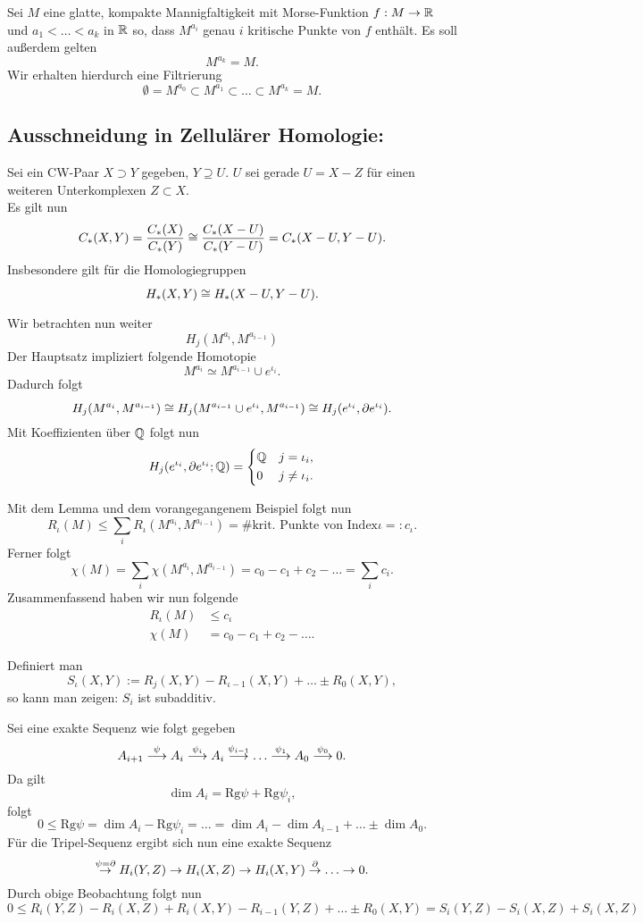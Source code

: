 Sei $M$ eine glatte, kompakte Mannigfaltigkeit mit Morse-Funktion $f : M \overset{}{\rightarrow} \mathbb{R}$ und $a_1 < \ldots < a_k$ in $\mathbb{R}$ so, dass $M^{a_i}$ genau $i$ kritische Punkte von $f$ enthält. Es soll außerdem gelten
\[ M^{a_k} = M. \]
Wir erhalten hierdurch eine Filtrierung
\[ \emptyset = M^{a_0} \subset M^{a_1} \subset \ldots \subset M^{a_k} = M. \]

\subsection{Ausschneidung in Zellulärer Homologie:}
Sei ein CW-Paar $X \supset Y$ gegeben, $Y \supseteq U$. $U$ sei gerade $U = X -Z$ für einen weiteren Unterkomplexen $Z \subset X$.\\
Es gilt nun
\[ C_*(X,Y) = \frac{C_*(X)}{C_*(Y)} 
\overset{}{\cong} \frac{C_*(X-U)}{C_*(Y-U)}
= C_*(X- U, Y - U). \]
Insbesondere gilt für die Homologiegruppen
\[ H_*(X,Y) \overset{}{\cong} H_*(X- U, Y-U). \]



Wir betrachten nun weiter
\[ H_j(M^{a_i}, M^{a_{i-1}})\]
Der Hauptsatz impliziert folgende Homotopie
\[ M^{a_i} \simeq M^{a_{i-1}} \cup e^{\iota_i}. \]
Dadurch folgt
\[  H_j(M^{a_i}, M^{a_{i-1}}) \overset{}{\cong} H_j(M^{a_{i-1}} \cup e^{\iota_i}, M^{a_{i-1}} ) \overset{}{\cong} H_j(e^{\iota_i}, \partial e^{\iota_i}). \]
Mit Koeffizienten über $\mathbb{Q}$ folgt nun
\[ H_j(e^{\iota_i}, \partial e^{\iota_i}; \mathbb{Q}) =
\left\lbrace
\begin{aligned}
&\mathbb{Q} && j = \iota_i,\\
&0 && j \neq \iota_i.
\end{aligned}
\right.
   \]
   
Mit dem Lemma und dem vorangegangenem Beispiel folgt nun
\[ R_\iota(M) \leq \sum_{i} R_\iota(M^{a_i}, M^{a_{i-1}}) = \# \text{krit. Punkte von Index} \iota =: c_\iota. \]
Ferner folgt
\[ \chi(M) = \sum_{i} \chi(M^{a_i}, M^{a_{i-1}}) = c_0 - c_1 + c_2 - \ldots = \sum_{i} c_i. \]
Zusammenfassend haben wir nun folgende 
\begin{align*}
R_\iota (M) &\leq c_\iota\\
\chi(M) &= c_0 - c_1 + c_2 - \ldots.
\end{align*}

Definiert man
\[ S_\iota(X,Y) := R_{j}(X,Y) - R_{\iota-1}(X,Y) + \ldots \pm R_0(X,Y), \]
so kann man zeigen:
\Lem{}
$S_i$ ist subadditiv.
\begin{Beweis}{}
Sei eine exakte Sequenz wie folgt gegeben
\[ A_{i+1} \overset{\psi}{\longrightarrow}A_{i} \overset{\psi_{i}}{\longrightarrow}A_{i} \overset{\psi_{i-1}}{\longrightarrow} \ldots  \overset{\psi_{1}}{\longrightarrow}A_{0} \overset{\psi_{0}}{\longrightarrow} 0.  \]
Da gilt
\[ \dim A_i = \text{Rg} \psi + \text{Rg} \psi_i, \]
folgt
\[ 0 \leq \text{Rg} \psi = \dim A_i - \text{Rg} \psi_i = \ldots = \dim A_i - \dim A_{i-1} + \ldots \pm \dim A_0.  \]
Für die Tripel-Sequenz ergibt sich nun eine exakte Sequenz
\[ \overset{\psi = \partial}{\rightarrow} H_i(Y,Z)
\overset{}{\rightarrow}
H_i(X,Z)
\overset{}{\rightarrow}
H_i(X,Y)
\overset{\partial}{\rightarrow}
\ldots
\overset{}{\rightarrow}
0. \]
Durch obige Beobachtung folgt nun
\[ 0\leq R_i(Y,Z) - R_i(X,Z) + R_i(X,Y) - R_{i-1} (Y,Z) + \ldots \pm R_0(X,Y) 
= S_i(Y,Z) - S_i(X,Z) + S_i(X,Z) \]
\end{Beweis}



